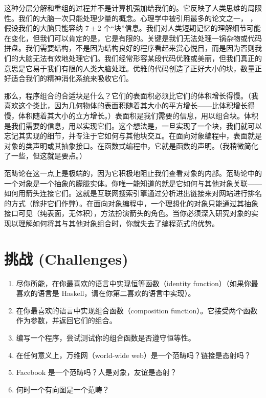 这种分层分解和重组的过程并不是计算机强加给我们的。它反映了人类思维的局限性。我们的大脑一次只能处理少量的概念。心理学中被引用最多的论文之一，
，假设我们的大脑只能容纳 $7 \pm 2$ 个“块”信息。我们对人类短期记忆的理解细节可能在变化，但我们可以肯定的是，它是有限的。关键是我们无法处理一锅杂物或代码拼盘。我们需要结构，不是因为结构良好的程序看起来赏心悦目，而是因为否则我们的大脑无法有效地处理它们。我们经常形容某段代码优雅或美丽，但我们真正的意思是它易于我们有限的人类大脑处理。优雅的代码创造了正好大小的块，数量正好适合我们的精神消化系统来吸收它们。

那么，程序组合的合适块是什么？它们的表面积必须比它们的体积增长得慢。（我喜欢这个类比，因为几何物体的表面积随着其大小的平方增长——比体积增长得慢，体积随着其大小的立方增长。）表面积是我们需要的信息，用以组合块。体积是我们需要的信息，用以实现它们。这个想法是，一旦实现了一个块，我们就可以忘记其实现的细节，并专注于它如何与其他块交互。在面向对象编程中，表面就是对象的类声明或其抽象接口。在函数式编程中，它就是函数的声明。（我稍微简化了一些，但这就是要点。）

范畴论在这一点上是极端的，因为它积极地阻止我们查看对象的内部。范畴论中的一个对象是一个抽象的朦胧实体。你唯一能知道的就是它如何与其他对象关联——如何用箭头连接它们。这就是互联网搜索引擎通过分析进出链接来对网站进行排名的方式（除非它们作弊）。在面向对象编程中，一个理想化的对象只能通过其抽象接口可见（纯表面，无体积），方法扮演箭头的角色。当你必须深入研究对象的实现以理解如何将其与其他对象组合时，你就失去了编程范式的优势。

\section{挑战 (Challenges)}

\begin{enumerate}
  \tightlist
  \item
  尽你所能，在你最喜欢的语言中实现恒等函数（identity function）（如果你最喜欢的语言是 Haskell，请在你第二喜欢的语言中实现）。
  \item
  在你最喜欢的语言中实现组合函数（composition function）。它接受两个函数作为参数，并返回它们的组合。
  \item
  编写一个程序，尝试测试你的组合函数是否遵守恒等性。
  \item
  在任何意义上，万维网（world-wide web）是一个范畴吗？链接是态射吗？
  \item
  Facebook 是一个范畴吗？人是对象，友谊是态射？
  \item
  何时一个有向图是一个范畴？
\end{enumerate}
